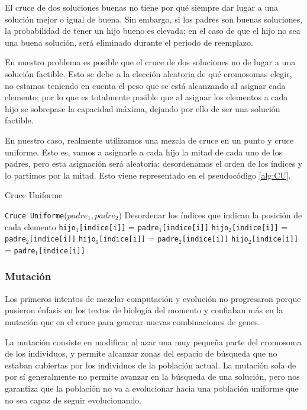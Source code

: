 El cruce de dos soluciones buenas no tiene por qué siempre dar lugar a una solución mejor o igual de buena. 
Sin embargo, si los padres son buenas soluciones, la probabilidad de tener un hijo bueno es elevada; en el caso de que el hijo no sea una buena solución, será eliminado durante el periodo de reemplazo. 

En nuestro problema es posible que el cruce de dos soluciones no de lugar a una solución factible. 
Esto se debe a la elección aleatoria de qué cromosomas elegir, no estamos teniendo en cuenta el peso que se está alcanzando al asignar cada elemento; por lo que es totalmente posible que  al asignar los elementos a cada hijo se sobrepase la capacidad máxima, dejando por ello de ser una solución factible. 


En nuestro caso, realmente utilizamos una mezcla de cruce en un punto y cruce uniforme. 
Esto es, vamos a asignarle a cada hijo la mitad de cada uno de los padres, pero esta asignación será aleatoria: desordenamos el orden de los índices y lo partimos por la mitad. 
Esto viene representado en el pseudocódigo \ref{alg:CU}.

\begin{algorithm}
\caption{Cruce Uniforme}\label{alg:CU}
\begin{algorithmic}[1]
\Procedure \texttt{Cruce Uniforme}($padre_1, padre_2$)
\State Desordenar los índices que indican la posición de cada elemento
		\State \texttt{hijo$_1$[indice[i]]} = \texttt{padre$_1$[indice[i]]}
		\State \texttt{hijo$_2$[indice[i]]} = \texttt{padre$_2$[indice[i]]}
	\Else
		\State \texttt{hijo$_1$[indice[i]]} = \texttt{padre$_2$[indice[i]]}
		\State \texttt{hijo$_2$[indice[i]]} = \texttt{padre$_1$[indice[i]]}
	\EndIf
\EndFor
\EndProcedure
\end{algorithmic}
\end{algorithm}

\subsubsection{Mutación}

Los primeros intentos de mezclar computación y evolución no progresaron porque pusieron énfasis en los textos de biología del momento y confiaban más en la mutación que en el cruce para generar nuevas combinaciones de genes. 

La mutación consiste en modificar al azar una muy pequeña parte del cromosoma de los individuos, y permite alcanzar zonas del espacio de búsqueda que no estaban cubiertas por los individuos de la población actual. 
La mutación sola de por sí generalmente no permite avanzar en la búsqueda de una solución, pero nos garantiza que la población no va a evolucionar hacia una población uniforme que no sea capaz de seguir evolucionando. 

